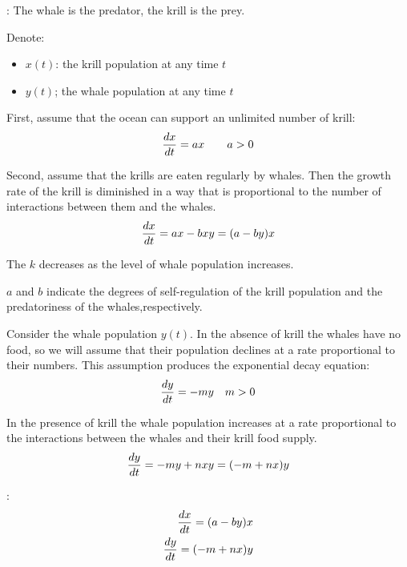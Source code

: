   \par {}: The whale is the predator, the krill is the prey.
  \par Denote:
  \begin{itemize}
    \item $x(t)$: the krill population at any time $t$
    \item $y(t)$; the whale population at any time $t$
  \end{itemize}
  \par First, assume that the ocean can support an unlimited number of krill:
    \[
      \dfrac{d x}{d t} = ax \qquad a > 0
    \]
  \par Second, assume that the krills are eaten regularly by whales. Then the growth rate of the krill is diminished in a way that is proportional to the number of interactions between them and the whales.
    \[
      \dfrac{d x}{d t} = ax - bxy = (a - by) x
    \]
  \par The  $k$ decreases as the level of whale population increases.
  \par $a$ and $b$ indicate the degrees of self-regulation of the krill population and the predatoriness of the whales,respectively.
  \par Consider the whale population $y(t)$. In the absence of krill the whales have no food, so we will assume that their population declines at a rate proportional to their
  numbers. This assumption produces the exponential decay equation:
    \[
      \dfrac{d y}{d t} = -my \quad m > 0
    \]
  \par In the presence of krill the whale population increases at a rate proportional to the interactions between the whales and their krill food supply.
  \[
    \dfrac{d y}{d t} = -my + nxy = (-m + nx) y
  \]
  \par {}:
    \begin{align*}
      \dfrac{d x}{d t} = (a - by) x \\
      \dfrac{d y}{d t} = (-m + nx) y
    \end{align*}